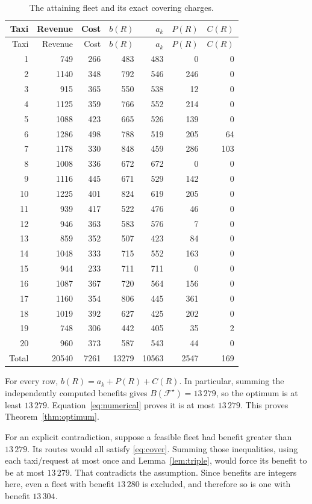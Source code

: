 \documentclass[11pt,a4paper]{article}
\newcommand{\F}{\mathcal F}
\begin{document}
\begin{longtable}{rrrrrrr}
\caption{The attaining fleet and its exact covering charges.}\label{tab:fleet}\\
\toprule
Taxi & Revenue & Cost & $b(R)$ & $a_k$ & $P(R)$ & $C(R)$\\
\midrule
\endfirsthead
\toprule
Taxi & Revenue & Cost & $b(R)$ & $a_k$ & $P(R)$ & $C(R)$\\
\midrule
\endhead
1 & 749 & 266 & 483 & 483 & 0 & 0 \\
2 & 1140 & 348 & 792 & 546 & 246 & 0 \\
3 & 915 & 365 & 550 & 538 & 12 & 0 \\
4 & 1125 & 359 & 766 & 552 & 214 & 0 \\
5 & 1088 & 423 & 665 & 526 & 139 & 0 \\
6 & 1286 & 498 & 788 & 519 & 205 & 64 \\
7 & 1178 & 330 & 848 & 459 & 286 & 103 \\
8 & 1008 & 336 & 672 & 672 & 0 & 0 \\
9 & 1116 & 445 & 671 & 529 & 142 & 0 \\
10 & 1225 & 401 & 824 & 619 & 205 & 0 \\
11 & 939 & 417 & 522 & 476 & 46 & 0 \\
12 & 946 & 363 & 583 & 576 & 7 & 0 \\
13 & 859 & 352 & 507 & 423 & 84 & 0 \\
14 & 1048 & 333 & 715 & 552 & 163 & 0 \\
15 & 944 & 233 & 711 & 711 & 0 & 0 \\
16 & 1087 & 367 & 720 & 564 & 156 & 0 \\
17 & 1160 & 354 & 806 & 445 & 361 & 0 \\
18 & 1019 & 392 & 627 & 425 & 202 & 0 \\
19 & 748 & 306 & 442 & 405 & 35 & 2 \\
20 & 960 & 373 & 587 & 543 & 44 & 0 \\
\midrule
Total & 20540 & 7261 & 13279 & 10563 & 2547 & 169 \\
\bottomrule
\end{longtable}
For every row, $b(R)=a_k+P(R)+C(R)$. In particular, summing the independently
computed benefits gives $B(\F^\star)=13\,279$, so the optimum is at least
$13\,279$. Equation~\eqref{eq:numerical} proves it is at most $13\,279$.
This proves Theorem~\ref{thm:optimum}.

For an explicit contradiction, suppose a feasible fleet had benefit greater
than $13\,279$. Its routes would all satisfy \eqref{eq:cover}. Summing those
inequalities, using each taxi/request at most once and
Lemma~\ref{lem:triple}, would force its benefit to be at most $13\,279$.
That contradicts the assumption. Since benefits are integers here, even a
fleet with benefit $13\,280$ is excluded, and therefore so is one with benefit
$13\,304$.
\end{document}
